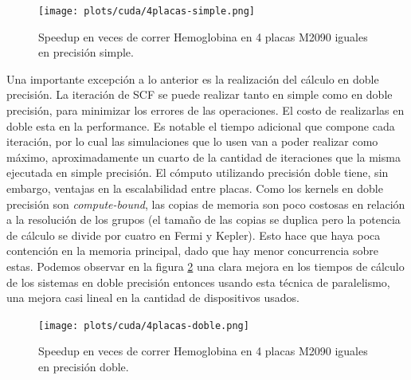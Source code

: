 \begin{figure}[htbp]
   \centering
   \texttt{[image: plots/cuda/4placas-simple.png]}
   \caption{Speedup en veces de correr Hemoglobina en 4 placas M2090 iguales en precisi\'on simple.}
   \label{plt:4placas-simple}
\end{figure}

Una importante excepci\'on a lo anterior es la realizaci\'on del c\'alculo en doble precisi\'on. La iteraci\'on
de SCF se puede realizar tanto en simple como en doble precisi\'on, para minimizar los
errores de las operaciones. El costo de realizarlas en doble esta en la performance. Es notable
el tiempo adicional que compone cada iteraci\'on, por lo cual las simulaciones que lo usen van
a poder realizar como m\'aximo, aproximadamente un cuarto de la cantidad de iteraciones que la misma ejecutada en simple precisi\'on.
El c\'omputo utilizando precisi\'on doble tiene, sin embargo, ventajas en la escalabilidad entre placas.
Como los kernels en doble precisi\'on son \textit{compute-bound}, las copias de memoria son poco costosas
en relaci\'on a la resoluci\'on de los grupos (el tama\~no de las copias se duplica pero la potencia de c\'alculo se divide
por cuatro en Fermi y Kepler). Esto hace que haya poca contenci\'on en la memoria principal,
dado que hay menor concurrencia sobre estas. Podemos observar en la figura \ref{plt:4placas-doble} una clara mejora en los tiempos
de c\'alculo de los sistemas en doble precisi\'on entonces usando esta t\'ecnica de paralelismo, una mejora casi
lineal en la cantidad de dispositivos usados.

\begin{figure}[htbp]
   \centering
   \texttt{[image: plots/cuda/4placas-doble.png]}
   \caption{Speedup en veces de correr Hemoglobina en 4 placas M2090 iguales en precisi\'on doble.}
   \label{plt:4placas-doble}
\end{figure}

